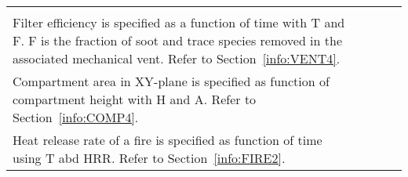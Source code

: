 \begin{longtable}{@{\extracolsep{\fill}}|l|l|l|l|l|}
{Vent opening is specified as a function of time with {\ct T} and {\ct F}. {\ct F} is the fraction of the vent width (for wall vents) or the vent area (for ceiling, floor, and mechanical vents). Refer to Section~\ref{info:VENT2}. \\

Filter efficiency is specified as a function of time with {\ct T} and {\ct F}. {\ct F} is the fraction of soot and trace species removed in the associated mechanical vent. Refer to Section~\ref{info:VENT4}. \\

Compartment area in XY-plane is specified as  function of compartment height with {\ct H} and {\ct A}. Refer to Section~\ref{info:COMP4}. \\

Heat release rate of a fire is specified as  function of time using {\ct T} abd {\ct HRR}. Refer to Section~\ref{info:FIRE2}.
}


>>>>>>> firemodels/master



\chapter{Running CFAST from a Command Prompt}

The model CFAST can also be run from a Windows command prompt.  CFAST can be run from any folder, and refer to a data file in any other folder. The fires and thermophysical properties have to be in either the data folder, or the executable folder. The data folder is checked first and then the executable folder.

\begin{lstlisting}
[drive1:\][folder1\]cfast [drive2:\][folder2\]project
\end{lstlisting}

The project name will have extensions appended as needed (see below). For example, to run a test case when the CFAST executable is located in c:$\backslash$firemodels$\backslash$cfast7 and the input data file is located in c:$\backslash$data, the following command could be used:

\begin{lstlisting}
c:\firemodels\cfast7\cfast c:\data\testfire0   <<< note that the extension is optional.
\end{lstlisting}

Command line options


\end{longtable}
